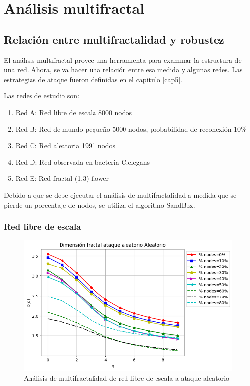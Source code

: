 \section{Análisis multifractal}

\subsection{Relación entre multifractalidad y robustez}

El análisis multifractal provee una herramienta para examinar la estructura de una red. Ahora, se va hacer una relación entre esa medida y algunas redes. Las estrategias de ataque fueron definidas en el capitulo \ref{cap5}.

Las redes de estudio son:

\begin{enumerate}
    \item Red A: Red libre de escala 8000 nodos
    \item Red B: Red de mundo pequeño 5000 nodos, probabilidad de reconexión 10\%
    \item Red C: Red aleatoria 1991 nodos
    \item Red D: Red observada en bacteria C.elegans
    \item Red E: Red fractal (1,3)-flower
\end{enumerate}

Debido a que se debe ejecutar el análisis de multifractalidad a medida que se pierde un porcentaje de nodos, se utiliza el algoritmo SandBox.

\subsubsection{Red libre de escala}

\begin{figure}[H]
    \centering
    \includegraphics[scale=0.7]{Capitulo6MultifractalidadYRobustez/imagenes/grafica_DqRandom20180512_143117ScaleFree8000Nodes.png}
    \caption{Análisis de multifractalidad de red libre de escala a ataque aleatorio }
\end{figure}

